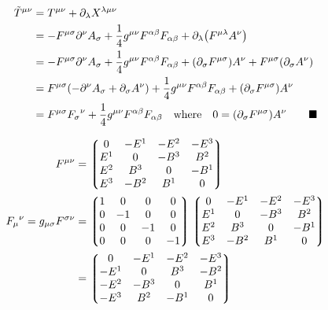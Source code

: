 \documentclass{article}
\begin{document}
\begin{align*}
  \tilde{T}^{\mu\nu} & =T^{\mu\nu} +\partial_\lambda X^{\lambda\mu \nu}                                                                                                                                  \\
                     & =-F^{\mu\sigma}\partial^\nu A_\sigma +\frac{1}{4}g^{\mu\nu} F^{\alpha\beta}F_{\alpha\beta} +\partial_\lambda \pqty{F^{\mu\lambda}A^\nu}                                           \\
                     & =-F^{\mu\sigma}\partial^\nu A_\sigma +\frac{1}{4}g^{\mu\nu} F^{\alpha\beta}F_{\alpha\beta} +\pqty{\partial_\sigma F^{\mu\sigma}}A^\nu  +F^{\mu\sigma}\pqty{\partial_\sigma A^\nu} \\
                     & =F^{\mu\sigma}\pqty{-\partial^\nu A_\sigma + {\partial_\sigma A^\nu}}+\frac{1}{4}g^{\mu\nu} F^{\alpha\beta}F_{\alpha\beta} +\pqty{\partial_\sigma F^{\mu\sigma}}A^\nu             \\
                     & =F^{\mu\sigma}{F_\sigma}^\nu+\frac{1}{4}g^{\mu\nu} F^{\alpha\beta}F_{\alpha\beta} \qq{where}0=\pqty{\partial_\sigma F^{\mu\sigma}}A^\nu  \qquad\blacksquare                       \\
\end{align*}

\begin{align*}
  F^{\mu\nu}                             & =\Pmqty{0 & -E^1 & -E^2 & -E^3 \\E^1 &0 & -B^3 & B^2\\E^2 & B^3 &0 & -B^1\\E^3 & -B^2 & B^1 &0\\}\\
  {F_\mu}^\nu=g_{\mu\sigma}F^{\sigma\nu} & =\Pmqty{1 & 0    & 0    & 0    \\0&-1&0&0\\0&0&-1&0\\0&0&0&-1}\Pmqty{0 & -E^1 & -E^2 & -E^3 \\E^1 &0 & -B^3 & B^2\\E^2 & B^3 &0 & -B^1\\E^3 & -B^2 & B^1 &0\\}\\
                                         & =\Pmqty{0 & -E^1 & -E^2 & -E^3 \\-E^1 &0&B^3&-B^2\\-E^2 & -B^3 &0 & B^1\\-E^3 & B^2 & -B^1 &0\\} \\
\end{align*}
\end{document}

